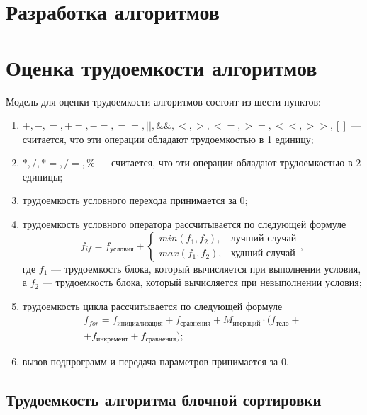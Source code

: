 \section{Разработка алгоритмов}


\section{Оценка трудоемкости алгоритмов}

Модель для оценки трудоемкости алгоритмов состоит из шести пунктов:
\begin{enumerate}
	\item $+, -, =, +=, -=, ==, ||, \&\&, <, >, <=, >=, <<, >>, []$ --- считается, что эти операции обладают трудоемкостью в 1 единицу;
	\item $*, /, *=, /=, \% $ --- считается, что эти операции обладают трудоемкостью в 2 единицы;
	\item трудоемкость условного перехода принимается за $0$;
	\item трудоемкость условного оператора рассчитывается по следующей формуле
	\begin{equation}
		\label{eq:if}
		f_{if} = f_{\text{условия}} + 
		\begin{cases}
			min(f_1, f_2), & \text{лучший случай}\\
			max(f_1, f_2), & \text{худший случай}
		\end{cases},
	\end{equation}
	где $f_1$ --- трудоемкость блока, который вычисляется при выполнении условия, а $f_2$ --- трудоемкость блока, который вычисляется при невыполнении условия;
	\item трудоемкость цикла рассчитывается по следующей формуле
	\begin{equation}
		\label{eq:for}
		\begin{gathered}
			f_{for} = f_{\text{инициализация}} + f_{\text{сравнения}} + M_{\text{итераций}} \cdot (f_{\text{тело}} +\\
			+ f_{\text{инкремент}} + f_{\text{сравнения}});
		\end{gathered}
	\end{equation}
	\item вызов подпрограмм и передача параметров принимается за $0$.
\end{enumerate}

\subsection{Трудоемкость алгоритма блочной сортировки}

